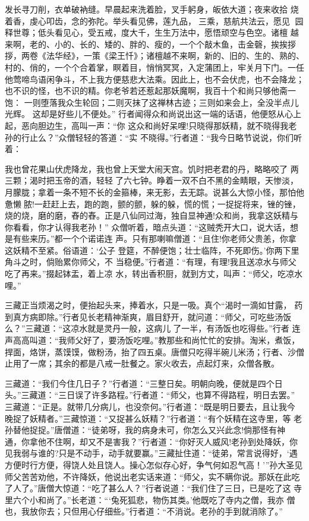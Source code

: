 发长寻刀削，衣单破衲缝。早晨起来洗着脸，叉手躬身，皈依大道；夜来收拾
烧着香，虔心叩齿，念的弥陀。举头看见佛，莲九品，三乘，慈航共法云，愿见
园释世尊；低头看见心，受五戒，度大千，生生万法中，愿悟顽空与色空。诸檀
越来啊，老的、小的、长的、矮的、胖的、瘦的，一个个敲木鱼，击金磬，挨挨拶
拶，两卷《法华经》，一策《梁王忏》；诸檀越不来啊，新的、旧的、生的、熟的、
村的、俏的，一个个合着掌，瞑着目，悄悄冥冥，入定蒲团上，牢关月下门。一任
他莺啼鸟语闲争斗，不上我方便慈悲大法乘。因此上，也不会伏虎，也不会降龙；
也不识的怪，也不识的精。你老爷若还惹起那妖魔啊，我百十个和尚只够他斋一饱：
一则堕落我众生轮回；二则灭抹了这禅林古迹；三则如来会上，全没半点儿光辉。
这却是好些儿不便处。”
行者闻得众和尚说出这一端的话语，他便怒从心上起，恶向胆边生，高叫一声：“你
这众和尚好呆哩!只晓得那妖精，就不晓得我老孙的行止么？”众僧轻轻的答道：“实
不晓得。”行者道：“我今日略节说说，你们听着：

我也曾花果山伏虎降龙，我也曾上天堂大闹天宫。饥时把老君的丹，略略咬了
两三颗；渴时把玉帝的酒，轻轻了六七钟。睁着一双不白不黑的金睛眼，天惨淡，
月朦胧；拿着一条不短不长的金箍棒，来无影，去无踪。说甚么大惊小怪，那怕他
惫懒脓!一赶赶上去，跑的跑，颤的颤，躲的躲，慌的慌；一捉捉将来，锉的锉，
烧的烧，磨的磨，舂的舂。正是八仙同过海，独自显神通!众和尚，我拿这妖精与
你看看，你才认得我老孙！”
众僧听着，暗点头道：“这贼秃开大口，说大话，想是有些来历。”都一个个诺诺连
声。只有那喇嘛僧道：“且住!你老师父贵恙，你拿这妖精不至紧。俗语道：‘公子
登筵，不醉便饱；壮士临阵，不死即伤。’你两下里角斗之时，倘贻累你师父，不
当稳便。”行者道：“有理，有理!我且送凉水与师父吃了再来。”掇起钵盂，着上凉
水，转出香积厨，就到方丈，叫声：“师父，吃凉水哩。”

三藏正当烦渴之时，便抬起头来，捧着水，只是一吸。真个“渴时一滴如甘露，
药到真方病即除。”行者见长老精神渐爽，眉目舒开，就问道：“师父，可吃些汤饭
么？”三藏道：“这凉水就是灵丹一般，这病儿了一半，有汤饭也吃得些。”行者
连声高高叫道：“我师父好了，要汤饭吃哩。”教那些和尚忙忙的安排。淘米，煮饭，
捍面，烙饼，蒸馍馍，做粉汤，抬了四五桌。唐僧只吃得半碗儿米汤；行者、沙僧
止用了一席；其余的都是八戒一肚餐之。家火收去，点起灯来，众僧各散。

三藏道：“我们今住几日子？”行者道：“三整日矣。明朝向晚，便就是四个日
头。”三藏道：“三日误了许多路程。”行者道：“师父，也算不得路程，明日去罢。”
三藏道：“正是。就带几分病儿，也没奈何。”行者道：“既是明日要去，且让我今
晚捉了妖精者。”三藏惊道：“又捉甚么妖精？”行者道：“有个妖精在这寺里，等
老孙替他捉捉。”唐僧道：“徒弟呀，我的病身未可，你怎么又兴此念!倘那怪有神
通，你拿他不住啊，却又不是害我？”行者道：“你好灭人威风!老孙到处降妖，你
见我弱与谁的?只是不动手，动手就要赢。”三藏扯住道：“徒弟，常言说得好，‘遇
方便时行方便，得饶人处且饶人。操心怎似存心好，争气何如忍气高！’”孙大圣见
师父苦苦劝他，不许降妖，他说出老实话来道：“师父，实不瞒你说。那妖在此吃
了人了。”唐僧大惊道：“吃了甚么人？”行者说道：“我们住了三日，已是吃了这
寺里六个小和尚了。”长老道：“‘兔死狐悲，物伤其类。’他既吃了寺内之僧，我亦
僧也，我放你去；只但用心仔细些。”行者道：“不消说。老孙的手到就消除了。”

